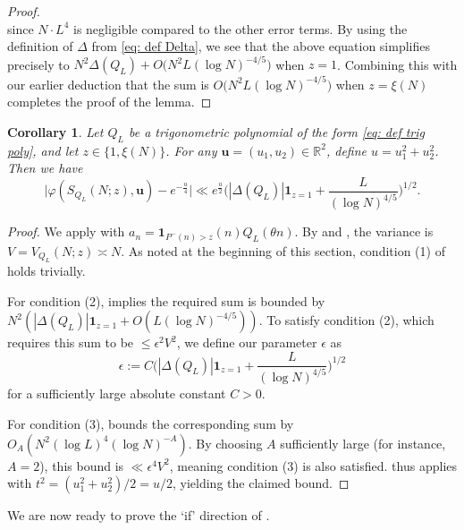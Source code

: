 \documentclass[12pt]{amsart}
\renewcommand{\le}{\leqslant}
\numberwithin{equation}{section}
\theoremstyle{plain}
\newtheorem{cor}[thm]{Corollary}
\theoremstyle{definition}
\newcommand{\R}{\mathbb{R}}
\renewcommand{\phi}{\varphi}
\begin{document}
\begin{proof}
\begin{equation}
		\end{equation}
		since $N\cdot L^4$ is negligible compared to the other error terms. By using the definition of $\Delta$ from \eqref{eq: def Delta}, we see that the above equation simplifies precisely to $N^2 \Delta(Q_L) +O\big(N^2 L(\log N)^{-4/5}\big)$ when $z = 1$. Combining this with our earlier deduction that the sum is $O\big(N^2 L(\log N)^{-4/5}\big)$ when $z = \xi(N)$ completes the proof of the lemma.
	\end{proof}
	\begin{cor}\label{cor: sound-xu application}
		Let $Q_L$ be a trigonometric polynomial of the form \eqref{eq: def trig poly}, and let $z \in \{1, \xi(N)\}$. For any $\bm{u} = (u_1, u_2) \in \R^2$, define $u = u_1^2+u_2^2$. Then we have
		$$ \big|\phi(S_{Q_L}(N; z),\bm{u})- e^{-\frac{u}{4}}\big| \ll e^{\frac{u}{2}} \bigg( |\Delta(Q_L)|\bm{1}_{z=1} + \frac{L}{(\log N)^{4/5}} \bigg)^{1/2}. $$
	\end{cor}
	\begin{proof}
		We apply  with $a_n = \bm{1}_{P^-(n) > z}(n)Q_L(\theta n)$. By  and , the variance is $V = V_{Q_L}(N; z) \asymp N$. As noted at the beginning of this section, condition (1) of  holds trivially. 
		
		For condition (2),  implies the required sum is bounded by $N^2( |\Delta(Q_L)|\bm{1}_{z=1} + O(L(\log N)^{-4/5}))$. To satisfy condition (2), which requires this sum to be $\le \epsilon^2 V^2$, we define our parameter $\epsilon$ as
		$$ \epsilon := C \bigg( |\Delta(Q_L)|\bm{1}_{z=1} + \frac{L}{(\log N)^{4/5}} \bigg)^{1/2} $$
		for a sufficiently large absolute constant $C>0$. 
		
		For condition (3),  bounds the corresponding sum by $O_A(N^2 (\log L)^4 (\log N)^{-A})$. By choosing $A$ sufficiently large (for instance, $A=2$), this bound is $\ll \epsilon^4 V^2$, meaning condition (3) is also satisfied.  thus applies with $t^2 = (u_1^2+u_2^2)/2 = u/2$, yielding the claimed bound.
	\end{proof}
	We are now ready to prove the `if' direction of .
\end{document}
